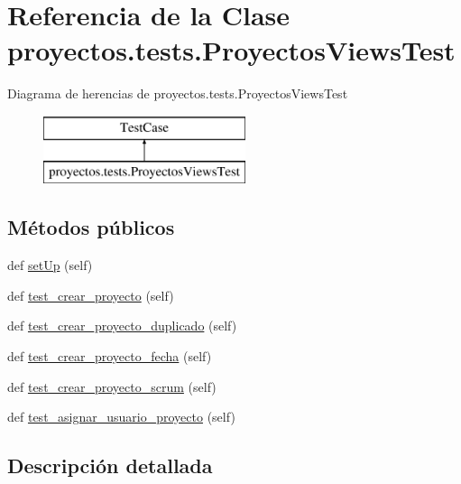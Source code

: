\hypertarget{classproyectos_1_1tests_1_1_proyectos_views_test}{}\section{Referencia de la Clase proyectos.\+tests.\+Proyectos\+Views\+Test}
\label{classproyectos_1_1tests_1_1_proyectos_views_test}
Diagrama de herencias de proyectos.\+tests.\+Proyectos\+Views\+Test\begin{figure}[H]
\begin{center}
\leavevmode
\includegraphics[height=2.000000cm]{classproyectos_1_1tests_1_1_proyectos_views_test}
\end{center}
\end{figure}
\subsection*{Métodos públicos}
\begin{DoxyCompactItemize}
\item 
def \hyperlink{classproyectos_1_1tests_1_1_proyectos_views_test_a1c1e5e610b39363438ec2c9360b88d04}{set\+Up} (self)
\item 
def \hyperlink{classproyectos_1_1tests_1_1_proyectos_views_test_ad5e42f0aecb7ad08a4a1f8215e28cbe1}{test\+\_\+crear\+\_\+proyecto} (self)
\item 
def \hyperlink{classproyectos_1_1tests_1_1_proyectos_views_test_adf46f99b9f2b7b10554144fed933df5e}{test\+\_\+crear\+\_\+proyecto\+\_\+duplicado} (self)
\item 
def \hyperlink{classproyectos_1_1tests_1_1_proyectos_views_test_a678a05f6c58b18dbdc16903887afc182}{test\+\_\+crear\+\_\+proyecto\+\_\+fecha} (self)
\item 
def \hyperlink{classproyectos_1_1tests_1_1_proyectos_views_test_a65ed4c6e7e4895a5e2094def089c5d32}{test\+\_\+crear\+\_\+proyecto\+\_\+scrum} (self)
\item 
def \hyperlink{classproyectos_1_1tests_1_1_proyectos_views_test_a5ff7af6f1e9df160044e5f505702c8de}{test\+\_\+asignar\+\_\+usuario\+\_\+proyecto} (self)
\end{DoxyCompactItemize}


\subsection{Descripción detallada}


